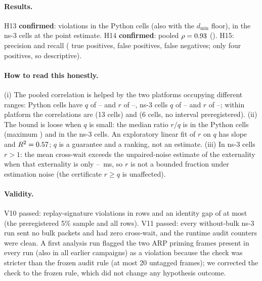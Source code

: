 \documentclass[11pt]{article}
\begin{document}
\paragraph{Results.} H13 \textbf{confirmed}: \FourPyViol{} violations in the Python cells (also \FourPyFloorViol{} with the $d_{\min}$ floor), \FourNsViol{} in the ns-3 cells at the point estimate. H14 \textbf{confirmed}: pooled $\rho=0.93$ (\FourRhoCI{}). H15: precision \FourPrec{} and recall \FourRecall{} (\FourTP{} true positives, \FourFP{} false positives, \FourFN{} false negatives; only four positives, so descriptive).
\paragraph{How to read this honestly.} (i) The pooled correlation is helped by the two platforms occupying different ranges: Python cells have $q$ of \FourPyQMin{}--\FourPyQMax{} and $r$ of \FourPyRMin{}--\FourPyRMax{}, ns-3 cells $q$ of \FourNsQMin{}--\FourNsQMax{} and $r$ of \FourNsRMin{}--\FourNsRMax{}; within platform the correlations are \FourRhoPy{} (13 cells) and \FourRhoNs{} (6 cells, no interval preregistered). (ii) The bound is loose when $q$ is small: the median ratio $r/q$ is \FourRatioMedPy{} in the Python cells (maximum \FourRatioMaxPy{}) and \FourRatioMedNs{} in the ns-3 cells. An exploratory linear fit of $r$ on $q$ has slope \FourOLSSlope{} and $R^2=0.57$; $q$ is a guarantee and a ranking, not an estimate. (iii) In \FourNsRAboveOne{} ns-3 cells $r>1$: the mean cross-wait exceeds the unpaired-noise estimate of the externality when that externality is only \FourNsEOverMin{}--\FourNsEOverMax{}~ms, so $r$ is not a bounded fraction under estimation noise (the certificate $r\ge q$ is unaffected).
\paragraph{Validity.} V10 passed: \FourVTenSig{} replay-signature violations in \FourVTenRows{} rows and an identity gap of at most \FourVTenGap{} (the preregistered 5\% sample and all rows). V11 passed: every without-bulk ns-3 run sent no bulk packets and had zero cross-wait, and the runtime audit counters were clean. A first analysis run flagged the two ARP priming frames present in every run (also in all earlier campaigns) as a violation because the check was stricter than the frozen audit rule (at most 20 untagged frames); we corrected the check to the frozen rule, which did not change any hypothesis outcome.
\end{document}
